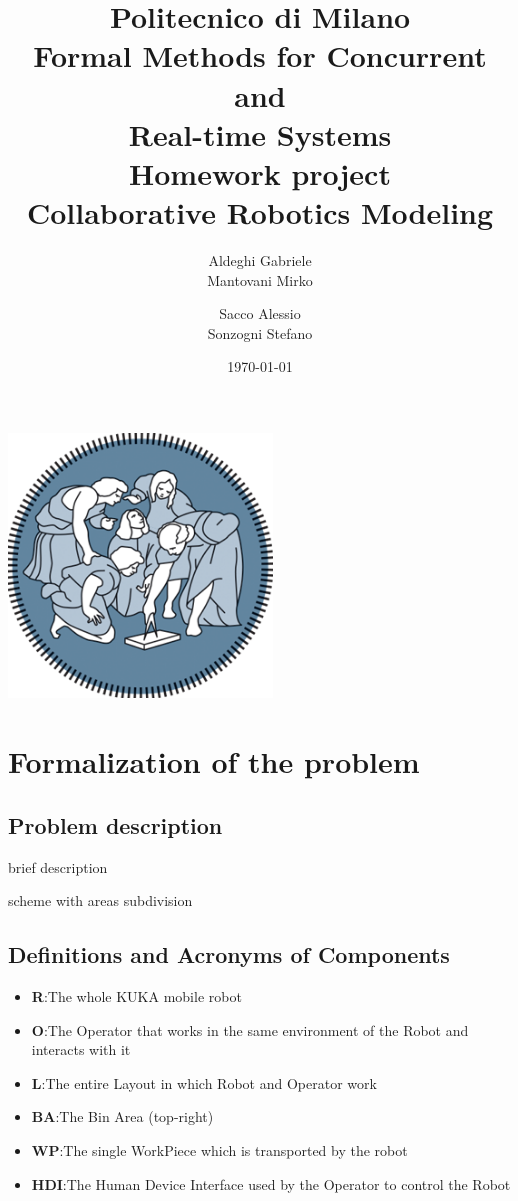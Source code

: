 \documentclass[a4paper]{article}
\title{Politecnico di Milano\\
Formal Methods for Concurrent \\
and \\
Real-time Systems\\
Homework project\\
\textbf{Collaborative Robotics Modeling }}
\author{Aldeghi Gabriele \\
  Mantovani Mirko \and
  Sacco Alessio \\
  Sonzogni Stefano}
\date{\today}
\begin{document}
\maketitle
\begin{center}
	\includegraphics[width=7cm]{images/polimi-logo}
\end{center}
\clearpage
{\hypersetup{hidelinks}\tableofcontents}
\clearpage

\section{Formalization of the problem}
\subsection{Problem description}
brief description

scheme with areas subdivision
\subsection{Definitions and Acronyms of Components}
\begin{itemize}
	\item \textbf{R}:\@ The whole KUKA mobile robot
	\item \textbf{O}:\@ The Operator that works in the same environment of the Robot and interacts with it
	\item \textbf{L}:\@ The entire Layout in which Robot and Operator work
	\item \textbf{BA}:\@ The Bin Area (top-right)
	\item \textbf{WP}:\@ The single WorkPiece which is transported by the robot
	\item \textbf{HDI}:\@ The Human Device Interface used by the Operator to control the Robot
\end{itemize}
\end{document}
